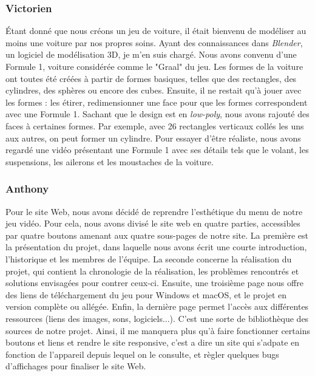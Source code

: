 \documentclass[a4paper,12pt]{article}
\begin{document}
    \subsubsection{Victorien}
        Étant donné que nous créons un jeu de voiture, il était 
        bienvenu de modéliser au moins une voiture par nos propres soins. 
        Ayant des connaissances dans \textsl{Blender}, un logiciel 
        de modélisation 3D, je m'en suis chargé. 
        Nous avons convenu d'une Formule 1, voiture considérée comme le "Graal" du jeu. 
        Les formes de la voiture ont toutes été créées à partir de formes basiques,
        telles que des rectangles, des cylindres, des sphères ou
        encore des cubes. 
        Ensuite, il ne restait qu'à jouer avec les formes : les étirer, 
        redimensionner une face pour que les formes correspondent avec une Formule 1. 
        Sachant que le design est en \textit{low-poly}, nous avons rajouté des
        faces à certaines formes. Par exemple, avec 26 rectangles verticaux collés les 
        uns aux autres, on peut former un cylindre.
        Pour essayer d'être réaliste, nous avons regardé une 
        vidéo présentant une Formule 1 avec ses détails tels que le volant, 
        les suspensions, les ailerons et les moustaches de la voiture.

    \subsubsection{Anthony}
        Pour le site Web, nous avons décidé de reprendre l'esthétique du
        menu de notre jeu vidéo. Pour cela, nous avons divisé le site web 
        en quatre parties, accessibles par quatre boutons amenant aux quatre 
        sous-pages de notre site. La première est la présentation du projet, dans laquelle
        nous avons écrit une courte introduction, l'historique et les membres
        de l'équipe. La seconde concerne la réalisation du projet, qui contient
        la chronologie de la réalisation, les problèmes rencontrés et solutions
        envisagées pour contrer ceux-ci. Ensuite, une troisième page nous 
        offre des liens de téléchargement du jeu pour Windows et macOS, et
        le projet en version complète ou allégée.
        Enfin, la dernière page permet l'accès aux différentes ressources
        (liens des images, sons, logiciels...). C'est une sorte de bibliothèque 
        des sources de notre projet.
        Ainsi, il me manquera plus qu'à faire fonctionner certains boutons et 
        liens et rendre le site responsive, c'est a dire un site qui s'adpate en 
        fonction de l'appareil depuis lequel on le consulte, et 
        règler quelques bugs d'affichages pour finaliser le site Web. 
\end{document}

